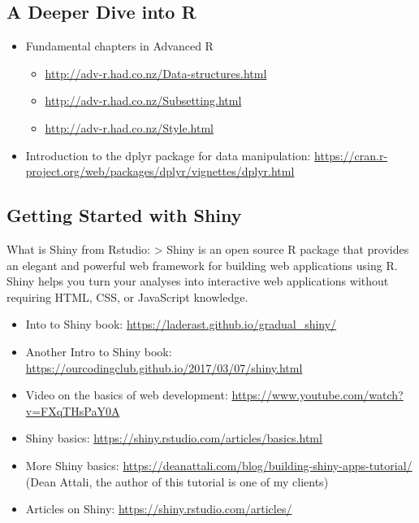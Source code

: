 \documentclass[
]{book}
\providecommand{\tightlist}{%
  \setlength{\itemsep}{0pt}\setlength{\parskip}{0pt}}
\begin{document}
\hypertarget{a-deeper-dive-into-r}{%
\subsection{A Deeper Dive into R}\label{a-deeper-dive-into-r}}

\begin{itemize}
\tightlist
\item
  Fundamental chapters in Advanced R

  \begin{itemize}
  \tightlist
  \item
    \url{http://adv-r.had.co.nz/Data-structures.html}
  \item
    \url{http://adv-r.had.co.nz/Subsetting.html}
  \item
    \url{http://adv-r.had.co.nz/Style.html}
  \end{itemize}
\item
  Introduction to the dplyr package for data manipulation: \url{https://cran.r-project.org/web/packages/dplyr/vignettes/dplyr.html}
\end{itemize}

\hypertarget{getting-started-with-shiny}{%
\subsection{Getting Started with Shiny}\label{getting-started-with-shiny}}

What is Shiny from Rstudio:
\textgreater{} Shiny is an open source R package that provides an elegant and powerful web framework for building web applications using R. Shiny helps you turn your analyses into interactive web applications without requiring HTML, CSS, or JavaScript knowledge.

\begin{itemize}
\tightlist
\item
  Into to Shiny book: \url{https://laderast.github.io/gradual_shiny/}
\item
  Another Intro to Shiny book: \url{https://ourcodingclub.github.io/2017/03/07/shiny.html}
\item
  Video on the basics of web development: \url{https://www.youtube.com/watch?v=FXqTHsPaY0A}
\item
  Shiny basics: \url{https://shiny.rstudio.com/articles/basics.html}
\item
  More Shiny basics: \url{https://deanattali.com/blog/building-shiny-apps-tutorial/} (Dean Attali, the author of this tutorial is one of my clients)
\item
  Articles on Shiny: \url{https://shiny.rstudio.com/articles/}
\end{itemize}
\end{document}

